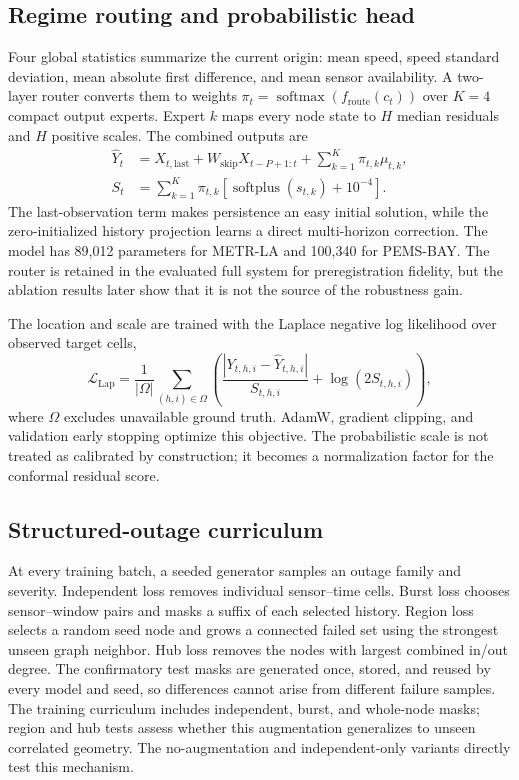 \documentclass[pdflatex,sn-mathphys-num]{sn-jnl}
\begin{document}
\subsection{Regime routing and probabilistic head}
Four global statistics summarize the current origin: mean speed, speed standard
deviation, mean absolute first difference, and mean sensor availability. A
two-layer router converts them to weights
$\pi_t=\operatorname{softmax}(f_{\mathrm{route}}(c_t))$ over $K=4$ compact
output experts. Expert $k$ maps every node state to $H$ median residuals and $H$
positive scales. The combined outputs are
\begin{align}
 \hat Y_t &= X_{t,\mathrm{last}}+
 W_{\mathrm{skip}}X_{t-P+1:t}+\sum_{k=1}^{K}\pi_{t,k}\mu_{t,k},\\
 S_t &= \sum_{k=1}^{K}\pi_{t,k}
 \left[\operatorname{softplus}(s_{t,k})+10^{-4}\right].
\end{align}
The last-observation term makes persistence an easy initial solution, while the
zero-initialized history projection learns a direct multi-horizon correction.
The model has 89,012 parameters for METR-LA and 100,340 for PEMS-BAY. The router
is retained in the evaluated full system for preregistration fidelity, but the
ablation results later show that it is not the source of the robustness gain.

The location and scale are trained with the Laplace negative log likelihood
over observed target cells,
\begin{equation}
 \mathcal{L}_{\mathrm{Lap}}=
 \frac{1}{|\Omega|}\sum_{(h,i)\in\Omega}
 \left(\frac{|Y_{t,h,i}-\hat Y_{t,h,i}|}{S_{t,h,i}}+
 \log(2S_{t,h,i})\right),
\end{equation}
where $\Omega$ excludes unavailable ground truth. AdamW, gradient clipping, and
validation early stopping optimize this objective. The probabilistic scale is
not treated as calibrated by construction; it becomes a normalization factor
for the conformal residual score.

\subsection{Structured-outage curriculum}
At every training batch, a seeded generator samples an outage family and
severity. Independent loss removes individual sensor--time cells. Burst loss
chooses sensor--window pairs and masks a suffix of each selected history.
Region loss selects a random seed node and grows a connected failed set using
the strongest unseen graph neighbor. Hub loss removes the nodes with largest
combined in/out degree. The confirmatory test masks are generated once, stored,
and reused by every model and seed, so differences cannot arise from different
failure samples. The training curriculum includes independent, burst, and
whole-node masks; region and hub tests assess whether this augmentation
generalizes to unseen correlated geometry. The no-augmentation and
independent-only variants directly test this mechanism.
\end{document}
